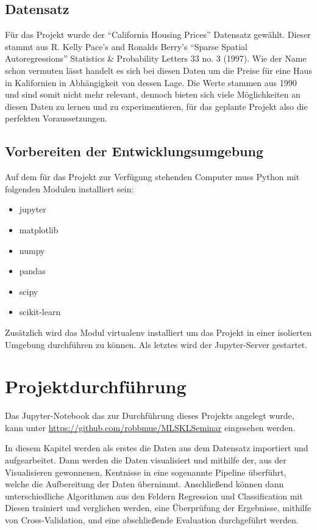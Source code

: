 \section{Datensatz}
\label{sec:datensatz}
Für das Projekt wurde der “California Housing Prices” Datensatz gewählt. Dieser stammt aus R. Kelly Pace’s and Ronalds Berry’s “Sparse Spatial Autoregressions” Statistics \& Probability Letters 33 no. 3 (1997). Wie der Name schon vermuten lässt handelt es sich bei diesen Daten um die Preise für eine Haus in Kalifornien in Abhängigkeit von dessen Lage. Die Werte stammen aus 1990  und sind somit nicht mehr relevant, dennoch bieten sich viele Möglichkeiten an diesen Daten zu lernen und zu experimentieren, für das geplante Projekt also die perfekten Voraussetzungen.

\section{Vorbereiten der Entwicklungsumgebung}
\label{sec:vorbereitenEntwicklungsumgebung}
Auf dem für das Projekt zur Verfügung stehenden Computer muss Python mit folgenden Modulen installiert sein: 
\begin{itemize}
\item jupyter
\item matplotlib
\item numpy
\item pandas
\item scipy
\item scikit-learn
\end{itemize}
Zusätzlich wird das Modul virtualenv installiert um das Projekt in einer isolierten Umgebung durchführen zu können. Als letztes wird der Jupyter-Server gestartet.

\chapter{Projektdurchführung}
\label{chap:projektdurchführung}
Das Jupyter-Notebook das zur Durchführung dieses Projekts angelegt wurde, kann unter \href{https://github.com/robbmue/MLSKLSeminar}{https://github.com/robbmue/MLSKLSeminar} eingesehen werden.

In diesem Kapitel werden als erstes die Daten aus dem Datensatz importiert und aufgearbeitet. Dann werden die Daten visualisiert und mithilfe der, aus der Visualisieren gewonnenen, Kentnisse in eine sogenannte Pipeline überführt, welche die Aufbereitung der Daten übernimmt.
Anschließend können dann unterschiedliche Algorithmen aus den Feldern Regression und Classification mit Diesen trainiert und verglichen werden, eine Überprüfung der Ergebnisse, mithilfe von Cross-Validation, und eine abschließende Evaluation durchgeführt werden.

